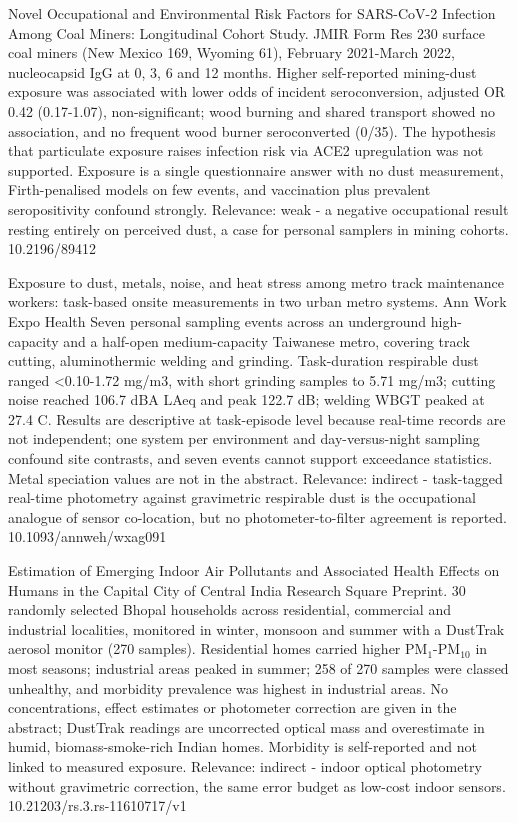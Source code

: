 \documentclass[10pt]{article}
\begin{document}
{Novel Occupational and Environmental Risk Factors for SARS-CoV-2 Infection Among Coal Miners: Longitudinal Cohort Study.}
{JMIR Form Res}
{230 surface coal miners (New Mexico 169, Wyoming 61), February 2021-March 2022, nucleocapsid IgG at 0, 3, 6 and 12 months. Higher self-reported mining-dust exposure was associated with lower odds of incident seroconversion, adjusted OR 0.42 (0.17-1.07), non-significant; wood burning and shared transport showed no association, and no frequent wood burner seroconverted (0/35). The hypothesis that particulate exposure raises infection risk via ACE2 upregulation was not supported. Exposure is a single questionnaire answer with no dust measurement, Firth-penalised models on few events, and vaccination plus prevalent seropositivity confound strongly. Relevance: weak - a negative occupational result resting entirely on perceived dust, a case for personal samplers in mining cohorts.}
{10.2196/89412}

{Exposure to dust, metals, noise, and heat stress among metro track maintenance workers: task-based onsite measurements in two urban metro systems.}
{Ann Work Expo Health}
{Seven personal sampling events across an underground high-capacity and a half-open medium-capacity Taiwanese metro, covering track cutting, aluminothermic welding and grinding. Task-duration respirable dust ranged <0.10-1.72 mg/m3, with short grinding samples to 5.71 mg/m3; cutting noise reached 106.7 dBA LAeq and peak 122.7 dB; welding WBGT peaked at 27.4 C. Results are descriptive at task-episode level because real-time records are not independent; one system per environment and day-versus-night sampling confound site contrasts, and seven events cannot support exceedance statistics. Metal speciation values are not in the abstract. Relevance: indirect - task-tagged real-time photometry against gravimetric respirable dust is the occupational analogue of sensor co-location, but no photometer-to-filter agreement is reported.}
{10.1093/annweh/wxag091}

{Estimation of Emerging Indoor Air Pollutants and Associated Health Effects on Humans in the Capital City of Central India}
{Research Square}
{Preprint. 30 randomly selected Bhopal households across residential, commercial and industrial localities, monitored in winter, monsoon and summer with a DustTrak aerosol monitor (270 samples). Residential homes carried higher PM$_{1}$-PM$_{10}$ in most seasons; industrial areas peaked in summer; 258 of 270 samples were classed unhealthy, and morbidity prevalence was highest in industrial areas. No concentrations, effect estimates or photometer correction are given in the abstract; DustTrak readings are uncorrected optical mass and overestimate in humid, biomass-smoke-rich Indian homes. Morbidity is self-reported and not linked to measured exposure. Relevance: indirect - indoor optical photometry without gravimetric correction, the same error budget as low-cost indoor sensors.}
{10.21203/rs.3.rs-11610717/v1}
\end{document}
